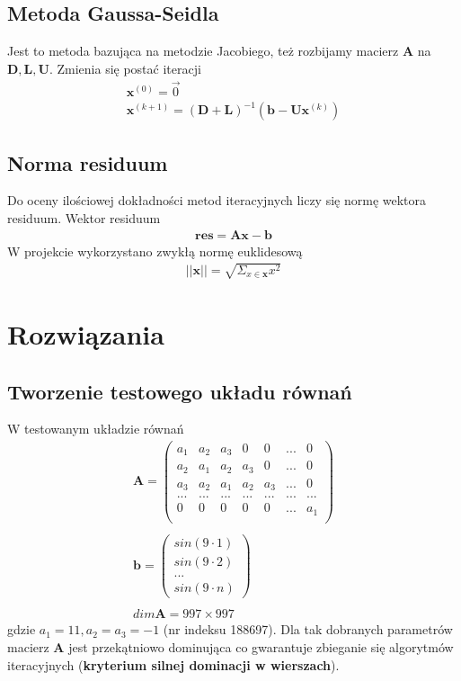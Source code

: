 \documentclass{article}
\begin{document}
\subsection*{Metoda Gaussa-Seidla}
Jest to metoda bazująca na metodzie Jacobiego, też rozbijamy macierz $\boldsymbol{A}$ na 
$\boldsymbol{D}, \boldsymbol{L}, \boldsymbol{U}$. Zmienia się postać iteracji
\begin{gather*}
	\boldsymbol{x}^{(0)} = \vec{0} \\
	\boldsymbol{x}^{(k+1)} = (\boldsymbol{D} + \boldsymbol{L})^{-1}
(\boldsymbol{b} - \boldsymbol{U}\boldsymbol{x}^{(k)})
\end{gather*}

\subsection*{Norma residuum}
Do oceny ilościowej dokładności metod iteracyjnych liczy się normę wektora residuum.
Wektor residuum
\begin{gather*}
	\boldsymbol{res} = \boldsymbol{A}\boldsymbol{x} - \boldsymbol{b}
\end{gather*}
W projekcie wykorzystano zwykłą normę euklidesową
\begin{gather*}
	||\boldsymbol{x}|| = \sqrt{\Sigma_{x \in \boldsymbol{x}} x^2}
\end{gather*}
\section{Rozwiązania}
\subsection{Tworzenie testowego układu równań}
W testowanym układzie równań
\begin{gather*}
	\boldsymbol{A} = \begin{pmatrix}
		a_1 & a_2 & a_3 & 0 & 0 & ...  & 0\\
		a_2 & a_1 & a_2 & a_3 & 0 & ...  & 0\\
		a_3 & a_2 & a_1 & a_2 & a_3 & ...  & 0\\
		...     & ...     &  ...    & ...     & ...     & ...  & ...\\
		0 & 0 & 0 & 0 & 0 & ...  & a_1\\
	\end{pmatrix} \\\\
	\boldsymbol{b} = \begin{pmatrix}
		sin(9 \cdot 1) \\
		sin(9 \cdot 2) \\
		... \\
		sin(9 \cdot n)
	\end{pmatrix} \\\\
	dim\boldsymbol{A} = 997 \times 997
\end{gather*}
gdzie $a_1=11, a_2 = a_3 = -1$ (nr indeksu 188697).
Dla tak dobranych parametrów macierz $\boldsymbol{A}$ jest przekątniowo dominująca
co gwarantuje zbieganie się algorytmów iteracyjnych (\textbf{kryterium silnej dominacji w wierszach}).
\end{document}
